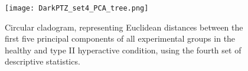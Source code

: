 \begin{figure}[h!]
\begin{center}
\texttt{[image: DarkPTZ\_set4\_PCA\_tree.png]}
\caption{Circular cladogram, representing Euclidean distances between the first five principal components of all experimental groups in the healthy and type II hyperactive condition, using the fourth set of descriptive statistics.}
\end{center}
\end{figure}
